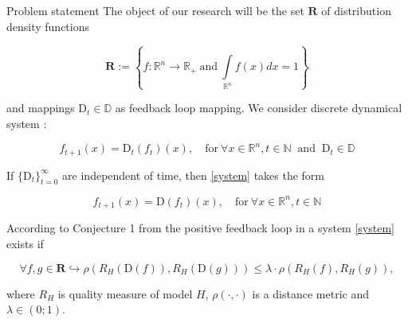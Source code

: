 \documentclass[aspectratio=169]{beamer}
\begin{document}
    \begin{frame}{Problem statement}
        \footnotesize
        The object of our research will be the set $\mathbf{R}$ of distribution density functions
    
        \begin{equation*}
            \mathbf{R} := \left\{f : \mathbb{R}^n \rightarrow \mathbb{R}_+ ~\text{and}~ \int\limits_{\mathbb{R}^n}f(x)dx = 1\right\}
        \end{equation*}
    
        and mappings $\text{D}_t \in \mathbb{D}$ as feedback loop mapping. We consider discrete dynamical system \cite{katok1995introduction}:

        \begin{equation}
            \label{system}
            f_{t+1}(x) = \text{D}_t(f_t)(x), \quad \text{for}~ \forall x \in \mathbb{R}^n, t \in \mathbb{N}~\text{ and }~ \text{D}_t \in \mathbb{D}
        \end{equation}

        If $\{\text{D}_t\}_{t=0}^{\infty}$ are independent of time, then \eqref{system} takes the form

        \begin{equation}
            \label{system_new}
            f_{t+1}(x) = \text{D}(f_t)(x), \quad \text{for}~ \forall x \in \mathbb{R}^n, t \in \mathbb{N}
        \end{equation}

        According to Conjecture 1 from \cite{khritankov2021hidden} the positive feedback loop in a system \eqref{system} exists if 

        \begin{equation*}
            \forall f, g \in \mathbf{R} \hookrightarrow \rho(R_H(\text{D}(f)), R_H(\text{D}(g))) \leq \lambda \cdot \rho(R_H(f), R_H(g)),
        \end{equation*}

        where $R_H$ is quality measure of model $H$, $\rho(\cdot, \cdot)$ is a distance metric and $\lambda \in (0; 1)$.       
    \end{frame}
\end{document}
